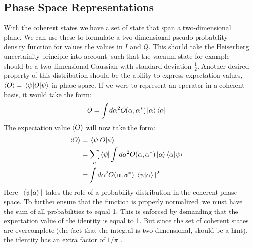
\subsection{Phase Space Representations}
With the coherent states we have a set of state that span a two-dimensional plane. We can use these to formulate a two dimensional pseudo-probability density function for values the values in $I$ and $Q$. This should take the Heisenberg uncertainity principle into account, such that the vacuum state for example should be a two dimensional Gaussian with standard deviation $\frac12$. Another desired property of this distribution should be the ability to express expectation values, $\expval{O} = \mel{\psi}{O}{\psi}$ in phase space. If we were to represent an operator in a coherent basis, it would take the form:
\begin{equation}
    O = \int d\alpha^2 O(\alpha, \alpha^*)\ket{\alpha}\bra{\alpha} 
\end{equation}
The expectation value $\expval{O}$ will now take the form: 
\begin{align*}
    \expval{O} &= \mel{\psi}{O}{\psi} \\
               &= \sum_n \bra{\psi} \int d\alpha^2 O(\alpha, \alpha^*)\ket{\alpha}\bra{\alpha} \ket{\psi}\\
               &= \int d\alpha^2 O(\alpha, \alpha^*) |\braket{\psi}{\alpha}|^2
\end{align*}
Here $|\braket{\psi}{\alpha}|$ takes the role of a probability distribution in the coherent phase space. To further ensure that the function is properly normalized, we must have the sum of all probabilities to equal 1. This is enforced by demanding that the expectation value of the identity is equal to 1. But since the set of coherent states are overcomplete (the fact that the integral is two dimensional, should be a hint), the identity has an extra factor of $1 / \pi$ \cite{knight}. 
